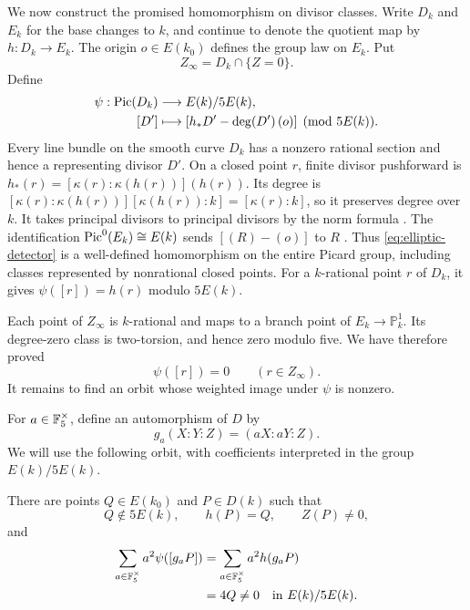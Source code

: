 We now construct the promised homomorphism on divisor classes. Write
$D_k$ and $E_k$ for the base changes to $k$, and continue to denote the
quotient map by $h:D_k\to E_k$. The origin $o\in E(k_0)$ defines the
group law on $E_k$. Put
\[
 Z_\infty=D_k\cap\{Z=0\}.
\]
Define
\begin{equation}\label{eq:elliptic-detector}
 \begin{split}
 \psi:\operatorname{Pic}(D_k)&\longrightarrow E(k)/5E(k),\\
 [D']&\longmapsto
 [h_*D'-\deg(D')\,(o)]\pmod{5E(k)}.
 \end{split}
\end{equation}
Every line bundle on the smooth curve $D_k$ has a nonzero rational
section and hence a representing divisor $D'$. On a closed point $r$,
finite divisor pushforward is
$h_*(r)=[\kappa(r):\kappa(h(r))](h(r))$. Its degree is
$[\kappa(r):\kappa(h(r))][\kappa(h(r)):k]=[\kappa(r):k]$,
so it preserves degree over $k$.
It takes principal divisors to principal divisors by the norm formula
\cite[Tag \texttt{02RT}]{StacksProject}. The identification
$\operatorname{Pic}^0(E_k)\cong E(k)$ sends $[(R)-(o)]$ to $R$
\cite[Proposition~III.3.4 and Remark~III.3.5.1]{Silverman2009}.
Thus \eqref{eq:elliptic-detector} is a well-defined homomorphism on the
entire Picard group, including classes represented by nonrational closed
points. For a $k$-rational point $r$ of $D_k$, it gives
$\psi([r])=h(r)$ modulo $5E(k)$.

Each point of $Z_\infty$ is $k$-rational and maps to a branch point of
$E_k\to\mathbb P^1_k$. Its degree-zero class is two-torsion, and hence
zero modulo five. We have therefore proved
\begin{equation}\label{eq:detector-at-infinity}
 \psi([r])=0\qquad(r\in Z_\infty).
\end{equation}
It remains to find an orbit whose weighted image under $\psi$ is nonzero.

For $a\in\mathbb F_5^\times$, define an automorphism of $D$ by
\[
    g_a(X:Y:Z)=(aX:aY:Z).
\]
We will use the following orbit, with coefficients interpreted in the
group $E(k)/5E(k)$.

\begin{lemma}
\label{lem:orbit}
There are points $Q\in E(k_0)$ and $P\in D(k)$ such that
\[
    Q\notin5E(k),\qquad h(P)=Q,\qquad Z(P)\ne0,
\]
and
\begin{equation}
\label{eq:weighted-orbit}
 \begin{aligned}
    \sum_{a\in\mathbb F_5^\times}a^2\psi([g_aP])
      &=\sum_{a\in\mathbb F_5^\times}a^2h(g_aP)\\
      &=4Q\ne0\quad\text{in }E(k)/5E(k).
 \end{aligned}
\end{equation}
\end{lemma}

